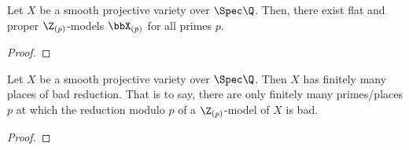         \begin{lemma}
            Let $X$ be a smooth projective variety over $\Spec \Q$. Then, there exist flat and proper $\Z_{(p)}$-models $\bbX_{(p)}$ for all primes $p$.
        \end{lemma}
            \begin{proof}
                
            \end{proof}
        
        \begin{theorem}[Shimura '55]
            Let $X$ be a smooth projective variety over $\Spec \Q$. Then $X$ has finitely many places of bad reduction. That is to say, there are only finitely many primes/places $p$ at which the reduction modulo $p$ of a $\Z_{(p)}$-model of $X$ is bad.
        \end{theorem}
            \begin{proof}
                
            \end{proof}
